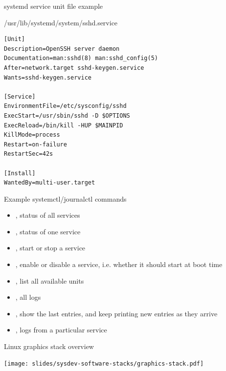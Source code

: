 \begin{frame}[fragile]{systemd service unit file example}
  \begin{block}{/usr/lib/systemd/system/sshd.service}
    {
      \scriptsize
\begin{verbatim}
[Unit]
Description=OpenSSH server daemon
Documentation=man:sshd(8) man:sshd_config(5)
After=network.target sshd-keygen.service
Wants=sshd-keygen.service

[Service]
EnvironmentFile=/etc/sysconfig/sshd
ExecStart=/usr/sbin/sshd -D $OPTIONS
ExecReload=/bin/kill -HUP $MAINPID
KillMode=process
Restart=on-failure
RestartSec=42s

[Install]
WantedBy=multi-user.target
\end{verbatim}
    }
  \end{block}
\end{frame}

\begin{frame}{Example systemctl/journalctl commands}
  \begin{itemize}
  \item {}, status of all services
  \item {}, status of one
    service
  \item {}, start or stop a service
  \item {}, enable
    or disable a service, i.e. whether it should start at boot time
  \item {}, list all available units
  \item {}, all logs
  \item {}, show the last entries, and keep printing
    new entries as they arrive
  \item {}, logs from
    a particular service
  \end{itemize}
\end{frame}

\begin{frame}{Linux graphics stack overview}
  \begin{center}
    \texttt{[image: slides/sysdev-software-stacks/graphics-stack.pdf]}
  \end{center}
\end{frame}

